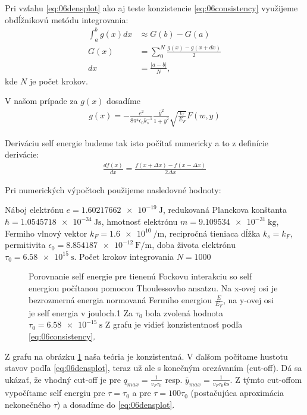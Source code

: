 Pri vzťahu \eqref{eq:06densplot} ako aj teste konzistencie \eqref{eq:06consistency} využijeme obdĺžnikovú metódu integrovania:
\begin{align}
\int_a^b g(x)dx &\approx G(b)-G(a)\\
G(x) &= \sum_0^N \frac{g(x)-g(x+dx)}{2}\\
dx &= \frac{|a-b|}{N} \text{,}
\end{align}
kde $N$ je počet krokov.

V našom prípade za $g(x)$ dosadíme 
\begin{align}
g(x) = -\frac{e^2}{8\pi^4\epsilon_0 k_s^{-1}} \frac{\bar{y}^2}{1+\bar{y}^2}\sqrt{\frac{\epsilon_\tau}{E_F}}F(w,y)
\end{align}

Deriváciu self energie budeme tak isto počítať numericky a to z definície derivácie:
\begin{align}
\frac{df(x)}{d x} = \frac{f(x+\Delta x)-f(x-\Delta x)}{2\Delta x}
\end{align}

Pri numerických výpočtoch použijeme nasledovné hodnoty:

Náboj elektrónu $e = \SI{1.60217662e-19}{\joule}$, redukovaná Planckova konštanta $\hbar = \SI{1.0545718e-34}{\joule\second}$, hmotnosť elektrónu
 $m = \SI{9.109534e-31}{\kilo\gram}$, Fermiho vlnový vektor $k_F = \SI{1.6e10}{\per\meter}$, recipročná tieniaca dĺžka $k_s=k_F$, permitivita
 $ \epsilon_0 = \SI{8.854187e-12}{\farad\per\meter}$, doba života elektrónu $\tau_0 = \SI{6.58e15}{\second}$. Počet krokov integrovania $N=1000$
\begin{figure}[H]
\centering
\caption{Porovnanie self energie pre tienenú Fockovu interakciu so self energiou počítanou pomocou Thoulessovho ansatzu. Na x-ovej osi je bezrozmerná energia normovaná Fermiho energiou $\frac{E}{E_F}$, na y-ovej osi je self energia v jouloch.1 Za $\tau_0$ bola zvolená hodnota $\tau_0=\SI{6.58e-15}{\second}$ Z grafu je vidieť konzistentnosť podľa \eqref{eq:06consistency}.}
\label{fig:plot_test} 
\end{figure}

Z grafu na obrázku \ref{fig:plot_test} naša teória je konzistentná. V ďalšom počítame hustotu stavov podľa \eqref{eq:06densplot}, teraz už ale s konečným orezávaním (cut-off). Dá sa ukázať, že vhodný cut-off je
pre $q_{max}=\frac{1}{v_F \tau_0}$ resp. $\bar{y}_{max}=\frac{1}{v_F \tau_0 ks}$. Z týmto cut-offom vypočítame self energiu pre $\tau=\tau_0$ a pre $\tau=100\tau_0$ (postačujúca aproximácia nekonečného $\tau$) a dosadíme do \eqref{eq:06densplot}. 

